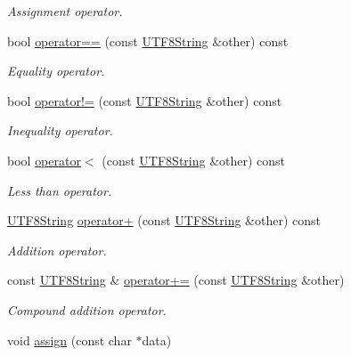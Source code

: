 \begin{DoxyCompactItemize}
\begin{DoxyCompactList}\small\item\em Assignment operator. \end{DoxyCompactList}\item 
bool \hyperlink{classchaos_1_1str_1_1_u_t_f8_string_ae4446150398d498e8aa9ebbc05ca7b52}{operator==} (const \hyperlink{classchaos_1_1str_1_1_u_t_f8_string}{U\-T\-F8\-String} \&other) const 
\begin{DoxyCompactList}\small\item\em Equality operator. \end{DoxyCompactList}\item 
bool \hyperlink{classchaos_1_1str_1_1_u_t_f8_string_a166394399a4d200494b40e034aa330da}{operator!=} (const \hyperlink{classchaos_1_1str_1_1_u_t_f8_string}{U\-T\-F8\-String} \&other) const 
\begin{DoxyCompactList}\small\item\em Inequality operator. \end{DoxyCompactList}\item 
bool \hyperlink{classchaos_1_1str_1_1_u_t_f8_string_ac7b54ed9c42a9c9a0a386d453d2c1daa}{operator$<$} (const \hyperlink{classchaos_1_1str_1_1_u_t_f8_string}{U\-T\-F8\-String} \&other) const 
\begin{DoxyCompactList}\small\item\em Less than operator. \end{DoxyCompactList}\item 
\hyperlink{classchaos_1_1str_1_1_u_t_f8_string}{U\-T\-F8\-String} \hyperlink{classchaos_1_1str_1_1_u_t_f8_string_a0d624a8e308b9a04511d31558ae37d8d}{operator+} (const \hyperlink{classchaos_1_1str_1_1_u_t_f8_string}{U\-T\-F8\-String} \&other) const 
\begin{DoxyCompactList}\small\item\em Addition operator. \end{DoxyCompactList}\item 
const \hyperlink{classchaos_1_1str_1_1_u_t_f8_string}{U\-T\-F8\-String} \& \hyperlink{classchaos_1_1str_1_1_u_t_f8_string_a9ce7f005abc581590ff3823db749873f}{operator+=} (const \hyperlink{classchaos_1_1str_1_1_u_t_f8_string}{U\-T\-F8\-String} \&other)
\begin{DoxyCompactList}\small\item\em Compound addition operator. \end{DoxyCompactList}\item 
void \hyperlink{classchaos_1_1str_1_1_u_t_f8_string_a483e71ec1090e346c63bf2b13b37ad7a}{assign} (const char $\ast$data)

\end{DoxyCompactItemize}
